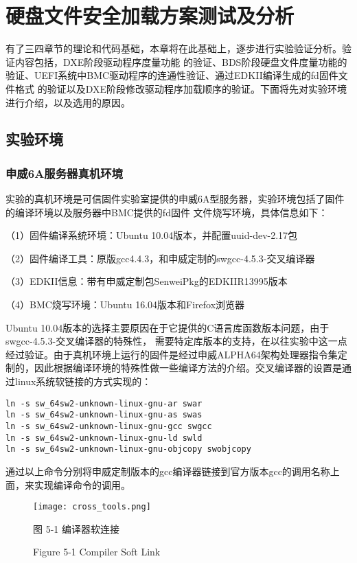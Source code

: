 %
%
\chapter{硬盘文件安全加载方案测试及分析}
\label{cha:test}
有了三四章节的理论和代码基础，本章将在此基础上，逐步进行实验验证分析。验证内容包括，DXE阶段驱动程序度量功能
的验证、BDS阶段硬盘文件度量功能的验证、UEFI系统中BMC驱动程序的连通性验证、通过EDKII编译生成的fd固件文件格式
的验证以及DXE阶段修改驱动程序加载顺序的验证。下面将先对实验环境进行介绍，以及选用的原因。

%
%
\section{实验环境}

\subsection{申威6A服务器真机环境}
实验的真机环境是可信固件实验室提供的申威6A型服务器，实验环境包括了固件的编译环境以及服务器中BMC提供的fd固件
文件烧写环境，具体信息如下：
\par （1）固件编译系统环境：Ubuntu 10.04版本，并配置uuid-dev-2.17包
\par （2）固件编译工具：原版gcc4.4.3，和申威定制的swgcc-4.5.3-交叉编译器
\par （3）EDKII信息：带有申威定制包SenweiPkg的EDKIIR13995版本
\par （4）BMC烧写环境：Ubuntu 16.04版本和Firefox浏览器
\par Ubuntu 10.04版本的选择主要原因在于它提供的C语言库函数版本问题，由于swgcc-4.5.3-交叉编译器的特殊性，
需要特定库版本的支持，在以往实验中这一点经过验证。由于真机环境上运行的固件是经过申威ALPHA64架构处理器指令集定
制的，因此根据编译环境的特殊性做一些编译方法的介绍。交叉编译器的设置是通过linux系统软链接的方式实现的：

\begin{lstlisting}
ln -s sw_64sw2-unknown-linux-gnu-ar swar
ln -s sw_64sw2-unknown-linux-gnu-as swas
ln -s sw_64sw2-unknown-linux-gnu-gcc swgcc
ln -s sw_64sw2-unknown-linux-gnu-ld swld
ln -s sw_64sw2-unknown-linux-gnu-objcopy swobjcopy    
\end{lstlisting}

通过以上命令分别将申威定制版本的gcc编译器链接到官方版本gcc的调用名称上面，来实现编译命令的调用。

\begin{figure}[htb]
    \label{ffs_format}
    \vspace{0cm}   
    \setlength{\abovecaptionskip}{0.3cm}
	\centering
    \texttt{[image: cross\_tools.png]}
    \caption*{图 5-1 编译器软连接}
    \setlength{\belowcaptionskip}{-0.7cm}
    \caption*{Figure 5-1 Compiler Soft Link}
\end{figure}

